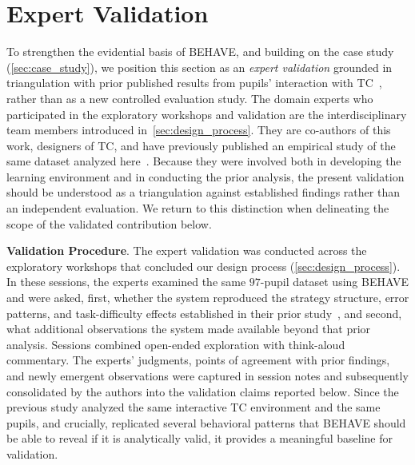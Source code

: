\documentclass[letterpaper,journal]{IEEEtran}
\begin{document}
\section{Expert Validation}
\label{sec:expert_validation}

To strengthen the evidential basis of \textsc{BEHAVE}, and building on the case study (\cref{sec:case_study}), we position this section as an \textit{expert validation} grounded in triangulation with prior published results from pupils' interaction with TC~\cite{host2026pupils}, rather than as a new controlled evaluation study.
The domain experts who participated in the exploratory workshops and validation are the interdisciplinary team members introduced in~\cref{sec:design_process}.
They are co-authors of this work, designers of TC, and have previously published an empirical study of the same dataset analyzed here~\cite{host2026pupils}.
Because they were involved both in developing the learning environment and in conducting the prior analysis, the present validation should be understood as a triangulation against established findings rather than an independent evaluation. We return to this distinction when delineating the scope of the validated contribution below.

\noindent
\textbf{Validation Procedure}.
The expert validation was conducted across the exploratory workshops that concluded our design process (\cref{sec:design_process}). 
In these sessions, the experts examined the same $97$-pupil dataset using \textsc{BEHAVE} and were asked, first, whether the system reproduced the strategy structure, error patterns, and task-difficulty effects established in their prior study~\cite{host2026pupils}, and second, what additional observations the system made available beyond that prior analysis.
Sessions combined open-ended exploration with think-aloud commentary.
The experts' judgments, points of agreement with prior findings, and newly emergent observations were captured in session notes and subsequently consolidated by the authors into the validation claims reported below.
Since the previous study analyzed the same interactive TC environment and the same pupils, and crucially, replicated several behavioral patterns that \textsc{BEHAVE} should be able to reveal if it is analytically valid, it provides a meaningful baseline for validation.
\end{document}
